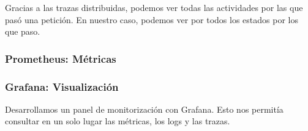 Gracias a las trazas distribuidas, podemos ver todas las actividades por las que pasó una petición. En nuestro caso, podemos ver por todos los estados por los que paso.

\subsubsection{Prometheus: Métricas}


\subsubsection{Grafana: Visualización}

Desarrollamos un panel de monitorización con Grafana. Esto nos permitía consultar en un solo lugar las métricas, los logs y las trazas.

